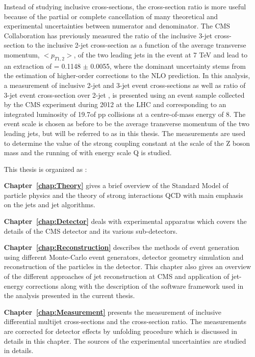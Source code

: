 Instead of studying inclusive cross-sections, the cross-section ratio is more useful because of the partial or complete cancellation of many theoretical and experimental uncertainties between numerator and denominator. The CMS Collaboration has previously measured the ratio of the inclusive 3-jet cross-section to the inclusive 2-jet cross-section as a function of the average transverse momentum, $<p_{T1,2}>$, of the two leading jets in the event at 7 TeV \cite {Chatrchyan:2013txa} and lead to an extraction of \alpsmz = 0.1148 $\pm$ 0.0055, where the dominant uncertainty stems from the estimation of higher-order corrections to the NLO prediction. In this analysis, a measurement of inclusive 2-jet and 3-jet event cross-sections as well as ratio of 3-jet event cross-section over 2-jet \rations, is presented using an event sample collected by the CMS experiment during 2012 at the LHC and corresponding to an integrated luminosity of 19.7\fbinv of pp collisions at a centre-of-mass energy of 8\TeV. The event scale is chosen as before to be the average transverse momentum of the two leading jets, but will be referred to as \httwo in this thesis. The measurements are used to determine the value of the strong coupling constant at the scale of the Z boson mass \alpsmz and the running of \alps with energy scale Q is studied.

This thesis is organized as :

{\bf Chapter~\ref{chap:Theory}} gives a brief overview of the Standard Model of particle physics and the theory of strong interactions QCD with main emphasis on the jets and jet algorithms. 

{\bf Chapter~\ref{chap:Detector}} deals with experimental apparatus which covers the details of the CMS detector and its various sub-detectors.

{\bf Chapter~\ref{chap:Reconstruction}} describes the methods of event generation using different Monte-Carlo event generators, detector geometry simulation and reconstruction of the particles in the detector. This chapter also gives an overview of the different approaches of jet reconstruction at CMS and application of jet-energy corrections along with the description of the software framework used in the analysis presented in the current thesis.

{\bf Chapter~\ref{chap:Measurement}} presents the measurement of inclusive differential multijet cross-sections and the cross-section ratio. The measurements are corrected for detector effects by unfolding procedure which is discussed in details in this chapter. The sources of the experimental uncertainties are studied in details. 

